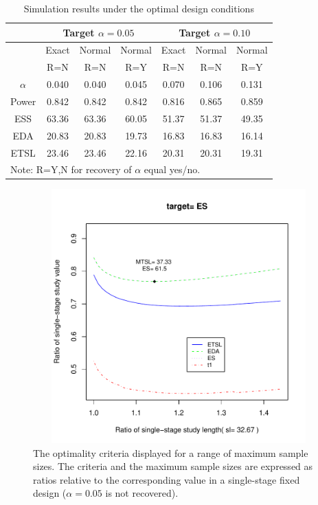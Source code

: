 \documentclass[12pt]{article}
\begin{document}
\begin{table}[h]
\caption{Simulation results under the optimal design conditions}
\label{optcond}
 \begin{center}
 \begin{tabular}{c|ccc|ccc}\hline\hline
&\multicolumn{3}{c}{Target $\alpha=0.05$}\vrule&\multicolumn{3}{c}{Target $\alpha=0.10$}\\
\hline
\vspace{-8pt}&\multicolumn{1}{c}{Exact}&\multicolumn{1}{c}{Normal}&\multicolumn{1}{c}{Normal}\vrule&\multicolumn{1}{c}{Exact}&\multicolumn{1}{c}{Normal}&\multicolumn{1}{c}{Normal}\\
&\multicolumn{1}{c}{R=N}&\multicolumn{1}{c}{R=N}&\multicolumn{1}{c}{R=Y}\vrule&\multicolumn{1}{c}{R=N}&{R=N}&\multicolumn{1}{c}{R=Y}\\
\hline
$\alpha$&0.040&0.040&0.045&0.070&0.106&0.131\\
Power   &0.842&0.842&0.842&0.816&0.865&0.859\\
ESS     &63.36&63.36&60.05&51.37&51.37&49.35\\
EDA     &20.83&20.83&19.73&16.83&16.83&16.14\\
ETSL    &23.46&23.46&22.16&20.31&20.31&19.31\\
\hline\hline \multicolumn{7}{l}{Note:  R=Y,N for recovery of $\alpha$ equal yes/no.}
\end{tabular}
\end{center}
\end{table}


\begin{figure}[h]
\caption{The optimality criteria displayed for a range of maximum sample sizes.  The criteria and
the maximum sample sizes are expressed as ratios relative to the corresponding value in a
single-stage fixed design ($\alpha=0.05$ is not recovered). } \label{optplot}
\includegraphics[height=3.85in,width=5in]{design.pdf}
\end{figure}
\end{document}
